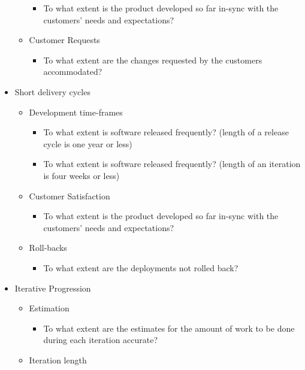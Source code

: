 \begin{itemize}
\begin{itemize}
\begin{itemize}
					\item To what extent is the product developed so far in-sync with the customers' needs and expectations?
				\end{itemize}
			\item Customer Requests
				\begin{itemize}
					\item To what extent are the changes requested by the customers accommodated?
				\end{itemize}			
		\end{itemize}
	\item Short delivery cycles
		\begin{itemize}
			\item Development time-frames
				\begin{itemize}
					\item To what extent is software released frequently? (length of a release cycle is one year or less)
					\item To what extent is software released frequently? (length of an iteration is four weeks or less)
				\end{itemize}
			\item Customer Satisfaction
				\begin{itemize}
					\item To what extent is the product developed so far in-sync with the customers' needs and expectations?
				\end{itemize}
			\item Roll-backs
				\begin{itemize}
					\item To what extent are the deployments not rolled back?
				\end{itemize}
		\end{itemize}
	\item Iterative Progression
		\begin{itemize}
			\item Estimation
				\begin{itemize}
					\item To what extent are the estimates for the amount of work to be done during each iteration accurate?
				\end{itemize}
			\item Iteration length
				\begin{itemize}

\end{itemize}
\end{itemize}
\end{itemize}
